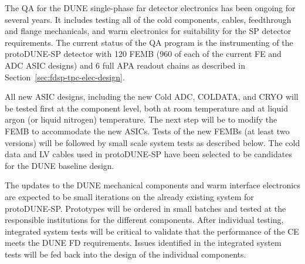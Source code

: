 The QA for the DUNE single-phase far detector electronics has been ongoing for several years. It includes testing all of the cold components, cables, feedthrough and flange mechanicals, and warm electronics for suitability for the SP detector requirements. The current status of the QA program is the instrumenting of the protoDUNE-SP detector with 120 FEMB (960 of each of the current FE and ADC ASIC designs) and 6 full APA readout chains as described in Section~\ref{sec:fdsp-tpc-elec-design}.

All new ASIC designs, including the new Cold ADC, COLDATA, and CRYO will be tested first at the component level, both at room temperature and at liquid argon (or liquid nitrogen) temperature. The next step will be to modify the FEMB to accommodate the new ASICs.  Tests of the new FEMBs (at least two versions) will be followed by small scale system tests as described below.  The cold data and LV cables used in protoDUNE-SP have been selected to be candidates for the DUNE baseline design.%

The updates to the DUNE mechanical components and warm interface electronics are expected to be small iterations on the already existing system for protoDUNE-SP. Prototypes will be ordered in small batches and tested at the responsible institutions for the different components. After individual testing, integrated system tests will be critical to validate that the performance of the CE meets the DUNE FD requirements. Issues identified in the integrated system tests will be fed back into the design of the individual components.
